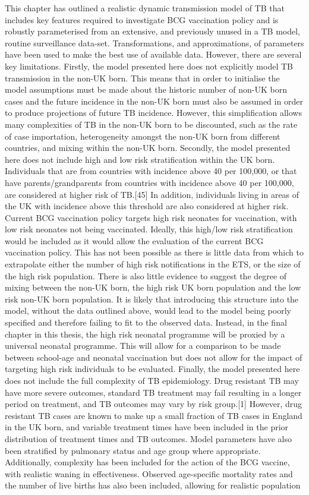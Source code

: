 \documentclass[11pt,twoside]{bristolthesis}
\begin{document}
  This chapter has outlined a realistic dynamic transmission model of TB that includes key features required to investigate BCG vaccination policy and is robustly parameterised from an extensive, and previously unused in a TB model, routine surveillance data-set. Transformations, and approximations, of parameters have been used to make the best use of available data. However, there are several key limitations. Firstly, the model presented here does not explicitly model TB transmission in the non-UK born. This means that in order to initialise the model assumptions must be made about the historic number of non-UK born cases and the future incidence in the non-UK born must also be assumed in order to produce projections of future TB incidence. However, this simplification allows many complexities of TB in the non-UK born to be discounted, such as the rate of case importation, heterogeneity amongst the non-UK born from different countries, and mixing within the non-UK born. Secondly, the model presented here does not include high and low risk stratification within the UK born. Individuals that are from countries with incidence above 40 per 100,000, or that have parents/grandparents from countries with incidence above 40 per 100,000, are considered at higher risk of TB.{[}45{]} In addition, individuals living in areas of the UK with incidence above this threshold are also considered at higher risk. Current BCG vaccination policy targets high risk neonates for vaccination, with low risk neonates not being vaccinated. Ideally, this high/low risk stratification would be included as it would allow the evaluation of the current BCG vaccination policy. This has not been possible as there is little data from which to extrapolate either the number of high risk notifications in the ETS, or the size of the high risk population. There is also little evidence to suggest the degree of mixing between the non-UK born, the high risk UK born population and the low risk non-UK born population. It is likely that introducing this structure into the model, without the data outlined above, would lead to the model being poorly specified and therefore failing to fit to the observed data. Instead, in the final chapter in this thesis, the high risk neonatal programme will be proxied by a universal neonatal programme. This will allow for a comparison to be made between school-age and neonatal vaccination but does not allow for the impact of targeting high risk individuals to be evaluated. Finally, the model presented here does not include the full complexity of TB epidemiology. Drug resistant TB may have more severe outcomes, standard TB treatment may fail resulting in a longer period on treatment, and TB outcomes may vary by risk group.{[}1{]} However, drug resistant TB cases are known to make up a small fraction of TB cases in England in the UK born, and variable treatment times have been included in the prior distribution of treatment times and TB outcomes. Model parameters have also been stratified by pulmonary status and age group where appropriate. Additionally, complexity has been included for the action of the BCG vaccine, with realistic waning in effectiveness. Observed age-specific mortality rates and the number of live births has also been included, allowing for realistic population 
\end{document}
